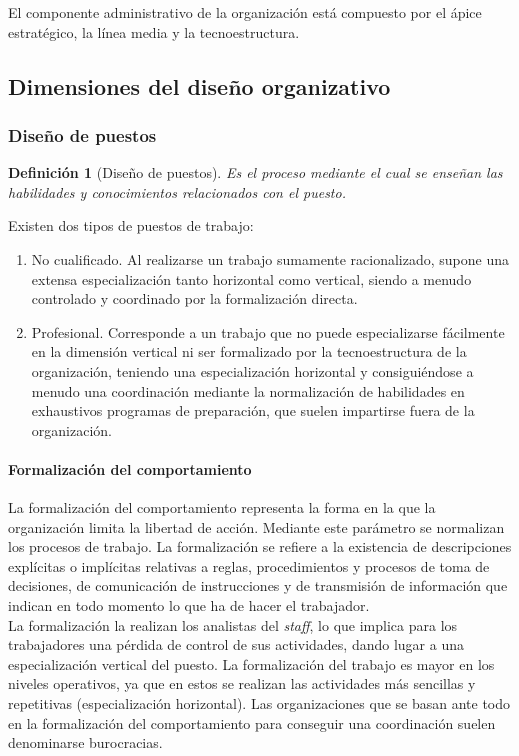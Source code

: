 \documentclass[12pt]{article}
\theoremstyle{definition_wo_parentheses}
\newtheorem{definicion}{Definición}[section]
\begin{document}
	El componente administrativo de la organización está compuesto por el ápice estratégico, la línea media y la tecnoestructura. 
	
	
\subsection{Dimensiones del diseño organizativo}

\subsubsection{Diseño de puestos}

\begin{definicion}[Diseño de puestos]
Es el proceso mediante el cual se enseñan las habilidades y conocimientos relacionados con el puesto. 
\end{definicion}

	Existen dos tipos de puestos de trabajo:
	
\begin{enumerate}
\item No cualificado. Al realizarse un trabajo sumamente racionalizado, supone una extensa especialización tanto horizontal como vertical, siendo a menudo controlado y coordinado por la formalización directa.

\item Profesional. Corresponde a un trabajo que no puede especializarse fácilmente en la dimensión vertical ni ser formalizado por la tecnoestructura de la organización, teniendo una especialización horizontal y consiguiéndose a menudo una coordinación mediante la normalización de habilidades en exhaustivos programas de preparación, que suelen impartirse fuera de la organización.
\end{enumerate}

\paragraph{Formalización del comportamiento} La formalización del comportamiento representa la forma en la que la organización limita la libertad de acción. Mediante este parámetro se normalizan los procesos de trabajo. La formalización se refiere a la existencia de descripciones explícitas o implícitas relativas a reglas, procedimientos y procesos de toma de decisiones, de comunicación de instrucciones y de transmisión de información que indican en todo momento lo que ha de hacer el trabajador.\\
La formalización la realizan los analistas del \textit{staff}, lo que implica para los trabajadores una pérdida de control de sus actividades, dando lugar a una especialización vertical del puesto. La formalización del trabajo es mayor en los niveles operativos, ya que en estos se realizan las actividades más sencillas y repetitivas (especialización horizontal). Las organizaciones que se basan ante todo en la formalización del comportamiento para conseguir una coordinación suelen denominarse burocracias.
\end{document}
